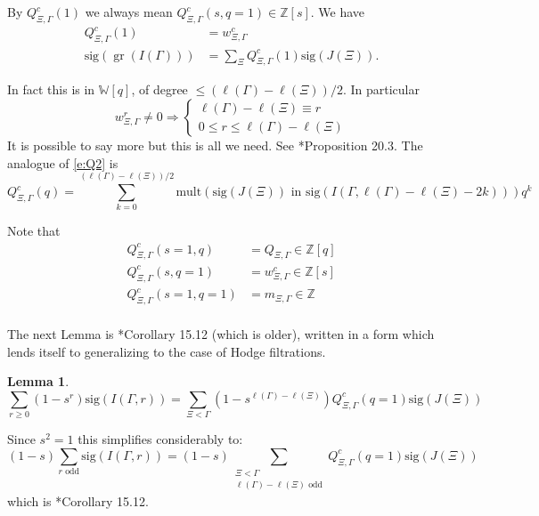 \documentclass[12pt,leqno]{article}
\newtheorem{lemma}[equation]{Lemma}
\newcommand{\sig}{\text{sig}}
\DeclareMathOperator{\gr}{\text{gr}}
\newcommand{\mult}{\text{mult}}
\newcommand{\Z}{\mathbb Z}
\newcommand{\W}{\mathbb W}
\begin{document}
By $Q^c_{\Xi,\Gamma}(1)$ we always mean $Q^c_{\Xi,\Gamma}(s,q=1)\in\Z[s]$.
We have
\begin{equation}
\label{e:Q^c(1)}
\begin{aligned}
Q^c_{\Xi,\Gamma}(1)&=w^c_{\Xi,\Gamma}\\
\sig(\gr(I(\Gamma)))&=\sum_{\Xi}Q^c_{\Xi,\Gamma}(1)\sig(J(\Xi)).
\end{aligned}
\end{equation}





In fact this is in $\W[q]$, of degree
$\le (\ell(\Gamma)-\ell(\Xi))/2$.  In particular
\begin{equation}
\label{e:nonzero}
w^{r}_{\Xi,\Gamma}\ne 0\Rightarrow
\begin{cases}
 \ell(\Gamma)-\ell(\Xi)\equiv r  \\
0\le r\le \ell(\Gamma)-\ell(\Xi)
\end{cases}
\end{equation}
It is possible to say more but this is all we need. See \cite{unitaryDual}*{Proposition 20.3}.
The analogue of \eqref{e:Q2} is
$$
Q^c_{\Xi,\Gamma}(q)=\sum_{k=0}^{(\ell(\Gamma)-\ell(\Xi))/2}\mult(\sig(J(\Xi))\text{ in }\sig(I(\Gamma,\ell(\Gamma)-\ell(\Xi)-2k)))q^k
$$


Note that
\begin{equation}
\label{e:Q1}
\begin{aligned}
Q^c_{\Xi,\Gamma}(s=1,q)&=Q_{\Xi,\Gamma}\in \Z[q]\\
Q^c_{\Xi,\Gamma}(s,q=1)&=w^c_{\Xi,\Gamma}\in\Z[s]\\
Q^c_{\Xi,\Gamma}(s=1,q=1)&=m_{\Xi,\Gamma}\in \Z\\
\end{aligned}
\end{equation}

The next Lemma is \cite{unitaryDual}*{Corollary 15.12} (which is
older), written in a form which lends itself to generalizing to the
case of Hodge filtrations.

\begin{lemma}
\normalfont
$$
\sum_{r\ge 0}(1-s^r)\sig(I(\Gamma,r))=
\sum_{\Xi<\Gamma}(1-s^{\ell(\Gamma)-\ell(\Xi)})Q^c_{\Xi,\Gamma}(q=1)\sig(J(\Xi))
$$
\end{lemma}
\label{l:1-s}
Since $s^2=1$ this simplifies considerably to:
\begin{equation}
\label{e:1-s}
(1-s)\sum_{r\text{ odd}}\sig(I(\Gamma,r))=
(1-s)\sum_{\substack{\Xi<\Gamma\\\ell(\Gamma)-\ell(\Xi)\text{ odd}}}Q^c_{\Xi,\Gamma}(q=1)\sig(J(\Xi))
\end{equation}
which is \cite{unitaryDual}*{Corollary 15.12}.
\end{document}
